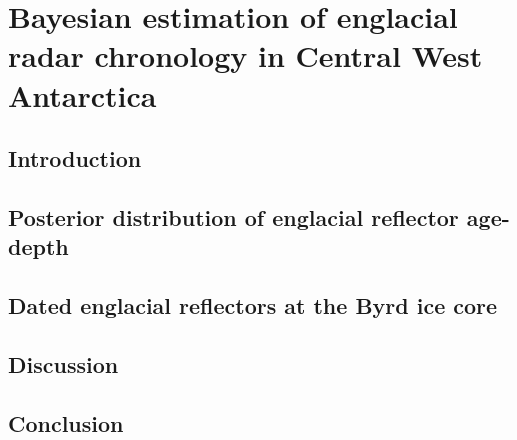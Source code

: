 
\chapter{Bayesian estimation of englacial radar chronology in Central West Antarctica}\label{chapter:layers}


 

\section{Introduction}\label{intro}
	

\section{Posterior distribution of englacial reflector age-depth}\label{byrdchronology}
	
  
  \label{radardepth}
  
	
\section{Dated englacial reflectors at the Byrd ice core}\label{agedepthresults}
	

\section{Discussion}\label{discussion}
	
	
\section{Conclusion}\label{conclusion}
	





